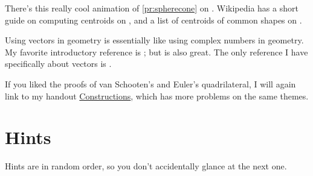 \documentclass[11pt,paper=letter]{scrartcl}
\begin{document}
There's this really cool animation of \autoref{pr:spherecone} on \cite{abelcavalieri}. Wikipedia has a short guide on computing centroids on \cite{wikipedialocating}, and a list of centroids of common shapes on \cite{wikipedialist}.

Using vectors in geometry is essentially like using complex numbers in geometry. My favorite introductory reference is \cite{egmo}; but \cite{chencomplex} is also great. The only reference I have specifically about vectors is \cite{livectors}.

If you liked the proofs of van Schooten's and Euler's quadrilateral, I will again link to my handout \href{http://cjquines.com/files/constructions.pdf}{Constructions}, which has more problems on the same themes.

\section{Hints}

Hints are in random order, so you don't accidentally glance at the next one.
\end{document}
